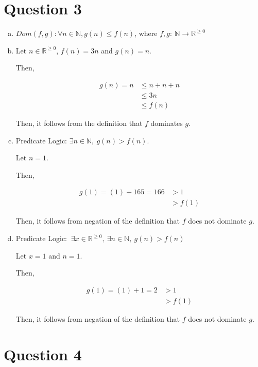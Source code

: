 \documentclass[12pt]{article}
\begin{document}
\section*{Question 3}
\begin{enumerate}[a.]
    \item

    $Dom(f,g):\forall n \in \mathbb{N}, g(n) \leq f(n)$, where $f,g:\:\mathbb{N} \to \mathbb{R}^{\geq0}$

    \item

    Let $n \in \mathbb{R}^{\geq0}$, $f(n) = 3n$ and $g(n) = n$.

    \bigskip

    Then,

    \begin{align}
        g(n) = n &\leq n + n + n\\
        &\leq 3n\\
        &\leq f(n)
    \end{align}

    \bigskip

    Then, it follows from the definition that $f$ dominates $g$.

    \item

    Predicate Logic: $\exists n \in \mathbb{N},\:g(n) > f(n)$.

    \bigskip

    Let $n = 1$.

    \bigskip

    Then,


    \begin{align}
        g(1) = (1) + 165 = 166 &> 1\\
        &> f(1)
    \end{align}

    \bigskip

    Then, it follows from negation of the definition that $f$ does not dominate $g$.

    \item

    Predicate Logic: $\:\exists x \in \mathbb{R}^{\geq 0},\:\exists n \in \mathbb{N},\:g(n) > f(n)$

    \bigskip

    Let $x = 1$ and $n = 1$.

    \bigskip

    Then,

    \begin{align}
        g(1) = (1) + 1 = 2 &> 1\\
        &> f(1)
    \end{align}

    \bigskip

    Then, it follows from negation of the definition that $f$ does not dominate $g$.


\end{enumerate}

\section*{Question 4}
\end{document}
